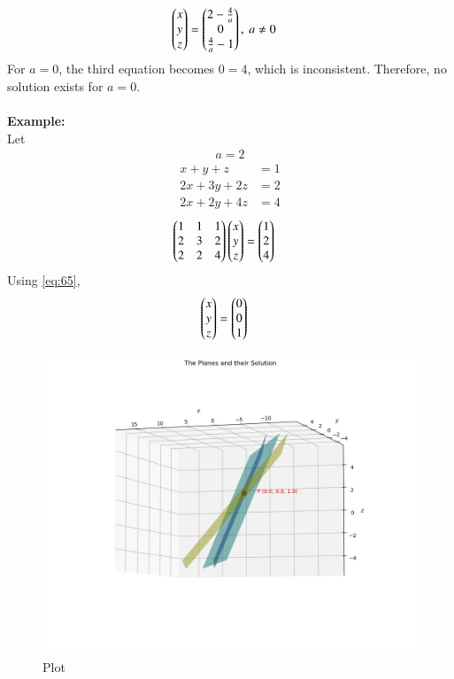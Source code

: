 \documentclass[journal]{IEEEtran}
\begin{document}
\begin{align}
    \begin{pmatrix}x\\y\\z\end{pmatrix} &= \begin{pmatrix}2 - \frac{4}{a} \\ 0 \\ \frac{4}{a} - 1\end{pmatrix},\text{ }a \neq 0 \label{eq:65}
\end{align}
For $a=0$, the third equation becomes $0=4$, which is inconsistent. Therefore, no solution exists for $a=0$. \\ \\
\textbf{Example:} \\
Let
\begin{align*}
    a = 2
\end{align*}
\begin{align*}
    x+y+z&=1 \\
    2x+3y+2z&=2 \\
    2x+2y+4z&=4
\end{align*}
\begin{align*}
    \begin{pmatrix}1 & 1 & 1 \\ 2 & 3 & 2 \\ 2 & 2 & 4\end{pmatrix}\begin{pmatrix}x\\y\\z\end{pmatrix} &= \begin{pmatrix}1\\2\\4\end{pmatrix}
\end{align*}
Using \eqref{eq:65},
\begin{align}
    \begin{pmatrix}x\\y\\z\end{pmatrix} &= \begin{pmatrix}0 \\ 0 \\ 1\end{pmatrix}
\end{align}

\begin{figure}[h!]
    \centering
    \includegraphics[width=\columnwidth]{figs/plot_c.jpg}
    \caption*{Plot}
    \label{fig:fig}
\end{figure}
\end{document}
